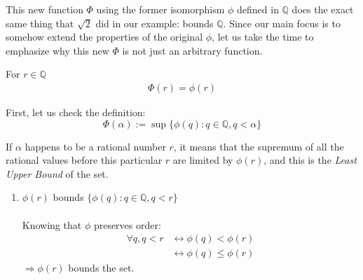This new function $\Phi$ using the former isomorphism $\phi$ defined in $\mathbb{Q}$ does the exact same thing that $\sqrt{2}$ did in our example: bounds $\mathbb{Q}$. Since our main focus is to somehow extend the properties of the original $\phi$, let us take the time to emphasize why this new $\Phi$ is not just an arbitrary function.

\begin{lemma}
For $r \in \mathbb{Q}$
\begin{align*}
\Phi(r)  = \phi(r)
\end{align*}
\end{lemma}

\begin{bookproof}
First, let us check the definition:
$$\Phi(\alpha) := \sup\{\phi(q): q \in \mathbb{Q}, q < \alpha \}$$

If $\alpha$ happens to be a rational number $r$, it means that the supremum of all the rational values before this particular $r$ are limited by $\phi(r)$, and this is the \textit{Least Upper Bound} of the set.

\begin{enumerate}
\item $\phi(r)$ bounds $\{\phi(q): q \in \mathbb{Q}, q < r \}$\\\\
Knowing that $\phi$ preserves order:
\begin{align*}
\forall q, q < r &\leftrightarrow \phi (q) < \phi (r)\\
&\leftrightarrow \phi(q) \leq \phi(r)
\end{align*}
$\Rightarrow \phi(r)$ bounds the set.
\end{enumerate}
\end{bookproof}

